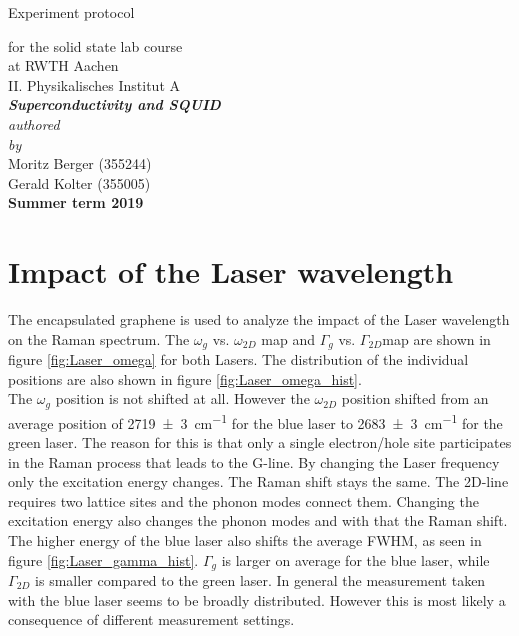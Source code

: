 \documentclass[12pt,a4paper]{article}
\author{Gerald}
\begin{document}
	\setlength{\parindent}{0pt} 
	\begin{center}
		{\LARGE Experiment protocol}\\
		\begin{large}
			for the solid state lab course\\[0.4cm]
			at RWTH Aachen\\
			II. Physikalisches Institut A\\[5.5cm]
			\Large\textbf{\textsl{Superconductivity and SQUID}}\\[5.5cm]
			\normalsize\textit{authored\\by}\\[0.4cm]
			\large{Moritz Berger (355244)\\Gerald Kolter (355005)}\\[2cm]
			\large \textbf{Summer term 2019}
		\end{large}
	\end{center}
	\newpage
	
	\tableofcontents
	\newpage

\section{Impact of the Laser wavelength}
The encapsulated graphene is used to analyze the impact of the Laser wavelength on the Raman spectrum. The $\omega_g$ vs. $\omega_{2D}$ map and $\Gamma_g$ vs. $\Gamma_{2D}$map are shown in figure \ref{fig:Laser_omega} for both Lasers. The distribution of the individual positions are also shown in figure \ref{fig:Laser_omega_hist}.\\
The $\omega_g$ position is not shifted at all. However the $\omega_{2D}$ position shifted from an average position of \SI{2719(3)}{cm^{-1}} for the blue laser to \SI{2683(3)}{cm^{-1}} for the green laser. The reason for this is that only a single electron/hole site participates in the Raman process that leads to the G-line. By changing the Laser frequency only the excitation energy changes. The Raman shift stays the same. The 2D-line requires two lattice sites and the phonon modes connect them. Changing the excitation energy also changes the phonon modes and with that the Raman shift.\\
The higher energy of the blue laser also shifts the average FWHM, as seen in figure \ref{fig:Laser_gamma_hist}. $\Gamma_g$ is larger on average for the blue laser, while $\Gamma_{2D}$ is smaller compared to the green laser. In general the measurement taken with the blue laser seems to be broadly distributed. However this is most likely a consequence of different measurement settings.\\
\\
\end{document}
